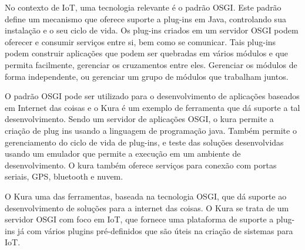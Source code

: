 No contexto de IoT, uma tecnologia relevante é o padrão OSGI. Este padrão define um mecanismo que oferece suporte a plug-ins em Java, controlando sua instalação e o seu ciclo de vida. Os plug-ins criados em um servidor OSGI podem oferecer e consumir serviços entre si, bem como se comunicar. Tais plug-ins podem construir aplicações que podem ser quebradas em vários módulos e que permita facilmente, gerenciar os cruzamentos entre eles. Gerenciar os módulos de forma independente, ou gerenciar um grupo de módulos que trabalham juntos.

O padrão OSGI pode ser utilizado para o desenvolvimento de aplicações baseados em Internet das coisas e o Kura é um exemplo de ferramenta que dá suporte a tal desenvolvimento. Sendo um servidor de aplicações OSGI, o kura permite a criação de plug ins usando a linguagem de programação java. Também permite o gerenciamento do ciclo de vida de plug-ins, e teste das soluções desenvolvidas usando um emulador que permite a execução em um ambiente de desenvolvimento. O kura também oferece serviços para conexão com portas seriais, GPS, bluetooth e nuvem.

O Kura uma das ferramentas, baseada na tecnologia OSGI, que dá suporte ao desenvolvimento de soluções para a internet das coisas. O Kura se trata de um servidor OSGI com foco em IoT, que fornece uma plataforma de suporte a plug-ins já com vários plugins pré-definidos que são úteis na criação de sistemas para IoT.
